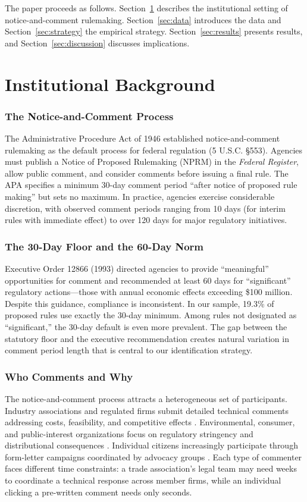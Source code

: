 \documentclass[12pt]{article}
\begin{document}
The paper proceeds as follows. Section~\ref{sec:background} describes the institutional setting of notice-and-comment rulemaking. Section~\ref{sec:data} introduces the data and Section~\ref{sec:strategy} the empirical strategy. Section~\ref{sec:results} presents results, and Section~\ref{sec:discussion} discusses implications.

\section{Institutional Background}
\label{sec:background}

\subsubsection*{The Notice-and-Comment Process} The Administrative Procedure Act of 1946 established notice-and-comment rulemaking as the default process for federal regulation (5 U.S.C. \S553). Agencies must publish a Notice of Proposed Rulemaking (NPRM) in the \textit{Federal Register}, allow public comment, and consider comments before issuing a final rule. The APA specifies a minimum 30-day comment period ``after notice of proposed rule making'' but sets no maximum. In practice, agencies exercise considerable discretion, with observed comment periods ranging from 10 days (for interim rules with immediate effect) to over 120 days for major regulatory initiatives.

\subsubsection*{The 30-Day Floor and the 60-Day Norm} Executive Order 12866 (1993) directed agencies to provide ``meaningful'' opportunities for comment and recommended at least 60 days for ``significant'' regulatory actions---those with annual economic effects exceeding \$100 million. Despite this guidance, compliance is inconsistent. In our sample, 19.3\% of proposed rules use exactly the 30-day minimum. Among rules not designated as ``significant,'' the 30-day default is even more prevalent. The gap between the statutory floor and the executive recommendation creates natural variation in comment period length that is central to our identification strategy.

\subsubsection*{Who Comments and Why} The notice-and-comment process attracts a heterogeneous set of participants. Industry associations and regulated firms submit detailed technical comments addressing costs, feasibility, and competitive effects \citep{yackee2006sweet}. Environmental, consumer, and public-interest organizations focus on regulatory stringency and distributional consequences \citep{libgober2020informational}. Individual citizens increasingly participate through form-letter campaigns coordinated by advocacy groups \citep{balla2021mass}. Each type of commenter faces different time constraints: a trade association's legal team may need weeks to coordinate a technical response across member firms, while an individual clicking a pre-written comment needs only seconds.
\end{document}
